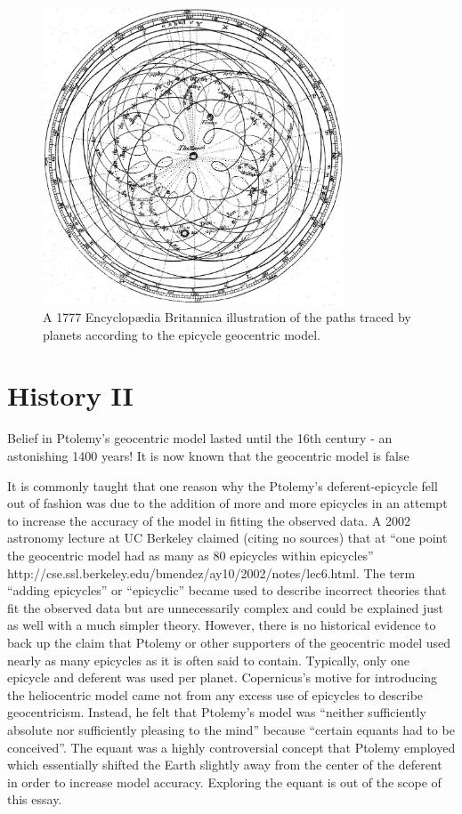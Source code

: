 \begin{figure}[h]
    \centering
    \includegraphics[width=9cm]{figures/ptolemaic_model.jpg}
    \caption{A 1777 Encyclopædia Britannica illustration of the paths traced by planets according to the epicycle geocentric model.}
    \label{fig:my_label}
\end{figure}
\section{History II}

Belief in Ptolemy’s geocentric model lasted until the 16th century - an astonishing 1400 years! It is now known that the geocentric model is false


It is commonly taught that one reason why the Ptolemy's deferent-epicycle fell out of fashion was due to the addition of more and more epicycles in an attempt to increase the accuracy of the model in fitting the observed data. A 2002 astronomy lecture at UC Berkeley claimed (citing no sources) that at ``one point the geocentric model had as many as 80 epicycles within epicycles'' http://cse.ssl.berkeley.edu/bmendez/ay10/2002/notes/lec6.html. The term ``adding epicycles'' or ``epicyclic'' became used to describe incorrect theories that fit the observed data but are unnecessarily complex and could be explained just as well with a much simpler theory. However, there is no historical evidence to back up the claim that Ptolemy or other supporters of the geocentric model used nearly as many epicycles as it is often said to contain. Typically, only one epicycle and deferent was used per planet. Copernicus's motive for introducing the heliocentric model came not from any excess use of epicycles to describe geocentricism. Instead, he felt that Ptolemy's model was “neither sufficiently absolute nor sufficiently pleasing to the mind” because “certain equants had to be conceived”. The equant was a highly controversial concept that Ptolemy employed which essentially shifted the Earth slightly away from the center of the deferent in order to increase model accuracy. Exploring the equant is out of the scope of this essay.
